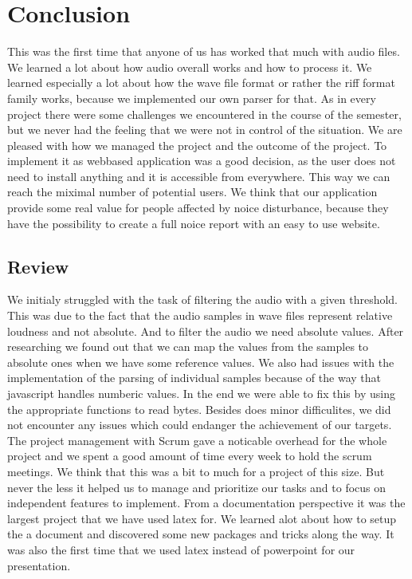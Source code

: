 \section{Conclusion}
This was the first time that anyone of us has worked that much with audio files. We learned a lot about how audio overall works and how to process it. We learned especially a lot about how the wave file format or rather the riff format family works, because we implemented our own parser for that. As in every project there were some challenges we encountered in the course of the semester, but we never had the feeling that we were not in control of the situation. We are pleased with how we managed the project and the outcome of the project. To implement it as webbased application was a good decision, as the user does not need to install anything and it is accessible from everywhere. This way we can reach the miximal number of potential users. We think that our application provide some real value for people affected by noice disturbance, because they have the possibility to create a full noice report with an easy to use website.

\subsection{Review}
We initialy struggled with the task of filtering the audio with a given threshold. This was due to the fact that the audio samples in wave files represent relative loudness and not absolute. And to filter the audio we need absolute values. After researching we found out that we can map the values from the samples to absolute ones when we have some reference values. 
We also had issues with the implementation of the parsing of individual samples because of the way that javascript handles numberic values. In the end we were able to fix this by using the appropriate functions to read bytes. Besides does minor difficulites, we did not encounter any issues which could endanger the achievement of our targets. 
The project management with Scrum gave a noticable overhead for the whole project and we spent a good amount of time every week to hold the scrum meetings. We think that this was a bit to much for a project of this size. But never the less it helped us to manage and prioritize our tasks and to focus on independent features to implement. 
From a documentation perspective it was the largest project that we have used latex for. We learned alot about how to setup the a document and discovered some new packages and tricks along the way. It was also the first time that we used latex instead of powerpoint for our presentation.

